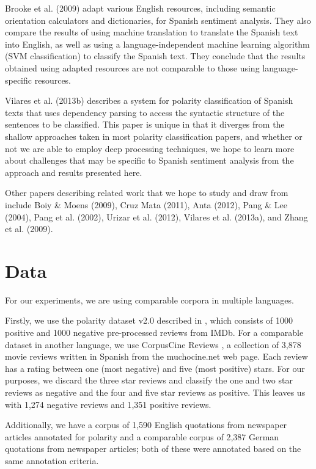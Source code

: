 \documentclass[11pt]{article}
\begin{document}
Brooke et al. (2009) adapt various English resources, including semantic orientation calculators and dictionaries, for Spanish sentiment analysis. They also compare the results of using machine translation to translate the Spanish text into English, as well as using a language-independent machine learning algorithm (SVM classification) to classify the Spanish text. They conclude that the results obtained using adapted resources are not comparable to those using language-specific resources.

Vilares et al. (2013b) describes a system for polarity classification of Spanish texts that uses dependency parsing to access the syntactic structure of the sentences to be classified. This paper is unique in that it diverges from the shallow approaches taken in most polarity classification papers, and whether or not we are able to employ deep processing techniques, we hope to learn more about challenges that may be specific to Spanish sentiment analysis from the approach and results presented here.

Other papers describing related work that we hope to study and draw from include Boiy & Moens (2009), Cruz Mata (2011), Anta (2012), Pang & Lee (2004), Pang et al. (2002), Urizar et al. (2012), Vilares et al. (2013a), and Zhang et al. (2009).

\section{Data}

For our experiments, we are using comparable corpora in multiple languages.

Firstly, we use the polarity dataset v2.0 described in \cite{pang2004}, which consists of 1000 positive and 1000 negative pre-processed reviews from IMDb.  For a comparable dataset in another language, we use CorpusCine Reviews \cite{cruzmata2011}, a collection of 3,878 movie reviews written in Spanish from the muchocine.net web page.  Each review has a rating between one (most negative) and five (most positive) stars.  For our purposes, we discard the three star reviews and classify the one and two star reviews as negative and the four and five star reviews as positive.  This leaves us with 1,274 negative reviews and 1,351 positive reviews.

Additionally, we have a corpus of 1,590 English quotations from newspaper articles annotated for polarity and a comparable corpus of 2,387 German quotations from newspaper articles; both of these were annotated based on the same annotation criteria.
\end{document}
